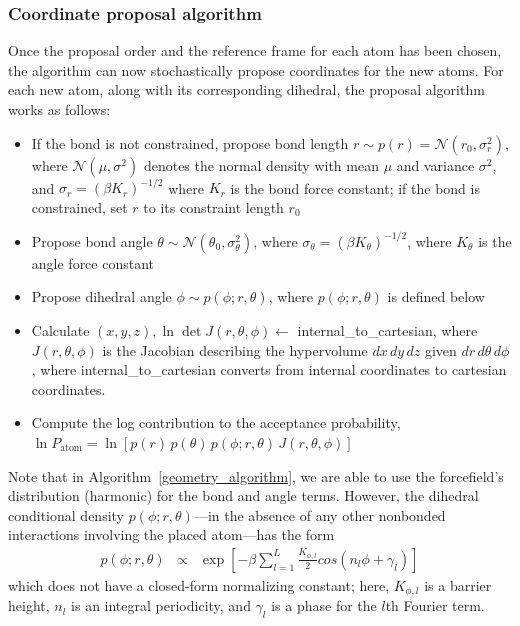 \subsubsection{Coordinate proposal algorithm}
%
Once the proposal order and the reference frame for each atom has been chosen, the algorithm can now stochastically propose coordinates for the new atoms.
%
For each new atom, along with its corresponding dihedral, the proposal algorithm works as follows:
%
\begin{itemize} \label{geometry_algorithm}
    \item If the bond is not constrained, propose bond length $r \sim p(r)=\mathcal{N}(r_0, \sigma^2_r)$, where $\mathcal{N}(\mu, \sigma^2)$ denotes the normal density with mean $\mu$ and variance $\sigma^2$, and $\sigma_r = (\beta K_r)^{-1/2}$ where $K_r$ is the bond force constant; if the bond is constrained, set $r$ to its constraint length $r_0$
    \item Propose bond angle $\theta \sim \mathcal{N}(\theta_0, \sigma^2_\theta)$, where $\sigma_\theta = (\beta K_\theta)^{-1/2}$, where $K_\theta$ is the angle force constant
    \item Propose dihedral angle $\phi \sim p(\phi; r, \theta)$, where $p(\phi ; r, \theta)$ is defined below
    \item Calculate $(x, y, z), \ln \det J(r, \theta, \phi) \longleftarrow$ internal\_to\_cartesian, where $J(r, \theta, \phi)$ is the Jacobian describing the hypervolume $dx \, dy \, dz$ given $dr \, d\theta \, d\phi$, where internal\_to\_cartesian converts from internal coordinates to cartesian coordinates.
    \item Compute the log contribution to the acceptance probability, $\ln P_\mathrm{atom} = \ln \left[ p(r) \, p(\theta) \, p(\phi; r, \theta) \, J(r, \theta, \phi) \right]$

\end{itemize}
%
Note that in Algorithm~\ref{geometry_algorithm}, we are able to use the forcefield's distribution (harmonic) for the bond and angle terms. 
%
However, the dihedral conditional density $p(\phi; r, \theta)$---in the absence of any other nonbonded interactions involving the placed atom---has the form
%
\begin{eqnarray}
p(\phi; r, \theta) &\propto& \exp\left[ -\beta \sum_{l=1}^L \frac{K_{\phi,l}}{2} cos(n_l \phi + \gamma_l) \right]
\end{eqnarray}
%
which does not have a closed-form normalizing constant; here, $K_{\phi,l}$ is a barrier height, $n_l$ is an integral periodicity, and $\gamma_l$ is a phase for the $l$th Fourier term.
